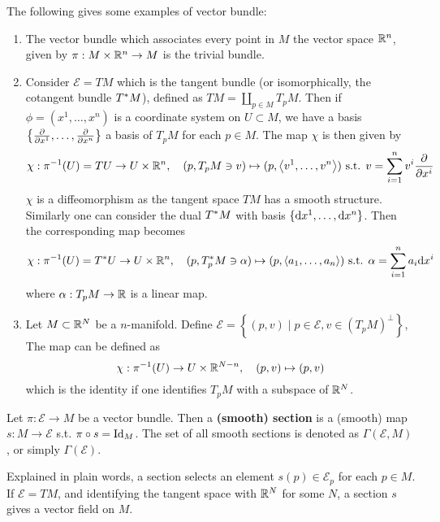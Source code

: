 \documentclass{article}
\begin{document}
\begin{example}
    The following gives some examples of vector bundle:
    \begin{enumerate}
        \item The vector bundle which associates every point in $M$ the vector space $\mathbb{R}^n$, given by $\pi: M \times \mathbb{R}^n \to M$ is the trivial bundle. 
        \item Consider $\mathcal{E} = TM$ which is the tangent bundle (or isomorphically, the cotangent bundle $T^{\ast}M$), defined as $TM = \coprod_{p \in M} T_p M$. Then if $\phi = (x^1, \dots, x^n)$ is a coordinate system on $U \subset M$, we have a basis $\left\{ \frac{\partial }{\partial x^1}, \dots, \frac{\partial }{\partial x^n} \right\}$ a basis of $T_p M$ for each $p \in M$. The map $\chi$ is then given by 
        \[
            \chi: \pi^{-1}(U) = TU \to U \times \mathbb{R}^n, \quad (p, T_p M \ni v) \mapsto (p, \left\langle v^1, \dots, v^n \right\rangle) \text{ s.t. } v = \sum_{i = 1}^{n} v^i \frac{\partial }{\partial x^i}
        \]
        $\chi$ is a diffeomorphism as the tangent space $TM$ has a smooth structure. Similarly one can consider the dual $T^{\ast}M$ with basis $\{\mathrm{d} x^1, \dots, \mathrm{d} x^n\}$. Then the corresponding map becomes
        \[
            \chi: \pi^{-1}(U) = T^{\ast}U \to U \times \mathbb{R}^n, \quad (p, T_p^{\ast}M \ni \alpha) \mapsto (p, \left\langle a_1, \dots, a_n \right\rangle) \text{ s.t. } \alpha = \sum_{i = 1}^n a_i\mathrm{d} x^i
        \]
        where $\alpha: T_p M \to \mathbb{R}$ is a linear map. 
        \item Let $M \subset \mathbb{R}^N$ be a $n$-manifold. Define $\mathcal{E} = \left\{ (p, v) \mid p \in \mathcal{E}, v \in (T_pM)^{\perp} \right\}$, The map can be defined as
        \[
            \chi: \pi^{-1}(U) \to U \times \mathbb{R}^{N - n}, \quad (p, v) \mapsto (p, v)
        \]
        which is the identity if one identifies $T_p M$ with a subspace of $\mathbb{R}^N$.
    \end{enumerate}
\end{example}

\begin{definition}[Section]
    Let $\pi: \mathcal{E} \to M$ be a vector bundle. Then a \textbf{(smooth) section} is a (smooth) map $s: M \to \mathcal{E}$ s.t. $\pi \circ s = \mathrm{Id}_M$. The set of all smooth sections is denoted as $\Gamma(\mathcal{E}, M)$, or simply $\Gamma(\mathcal{E})$.
\end{definition}

\begin{remark}
    Explained in plain words, a section selects an element $s(p) \in \mathcal{E}_p$ for each $p \in M$. If $\mathcal{E} = TM$, and identifying the tangent space with $\mathbb{R}^N$ for some $N$, a section $s$ gives a vector field on $M$.
\end{remark}
\end{document}

